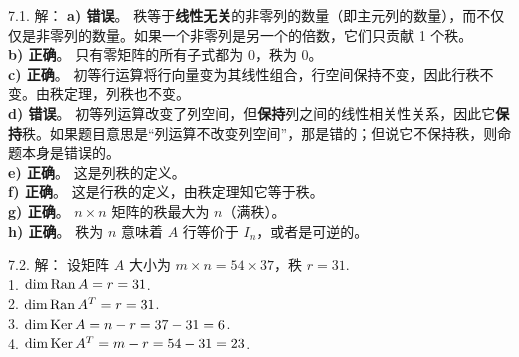 \begin{exer}
\vspace{5ex}


7.1. 解： \textbf{a) 错误}。
秩等于\textbf{线性无关}的非零列的数量（即主元列的数量），而不仅仅是非零列的数量。如果一个非零列是另一个的倍数，它们只贡献 1 个秩。
\\
\textbf{b) 正确}。
只有零矩阵的所有子式都为 0，秩为 0。
\\
\textbf{c) 正确}。
初等行运算将行向量变为其线性组合，行空间保持不变，因此行秩不变。由秩定理，列秩也不变。
\\
\textbf{d) 错误}。
初等列运算改变了列空间，但\textbf{保持}列之间的线性相关性关系，因此它\textbf{保持}秩。如果题目意思是“列运算不改变列空间”，那是错的；但说它不保持秩，则命题本身是错误的。
\\
\textbf{e) 正确}。
这是列秩的定义。
\\
\textbf{f) 正确}。
这是行秩的定义，由秩定理知它等于秩。
\\
\textbf{g) 正确}。
$n \times n$ 矩阵的秩最大为 $n$（满秩）。
\\
\textbf{h) 正确}。
秩为 $n$ 意味着 $A$ 行等价于 $I_n$，或者是可逆的。

7.2. 解：
设矩阵 $A$ 大小为 $m \times n = 54 \times 37$，秩 $r = 31$.~\\
1.  $\dim \operatorname{Ran} A = r = 31$.~\\
2.  $\dim \operatorname{Ran} A^T = r = 31$.~\\
3.  $\dim \operatorname{Ker} A = n - r = 37 - 31 = 6$.~\\
4.  $\dim \operatorname{Ker} A^T = m - r = 54 - 31 = 23$.~


\end{exer}
